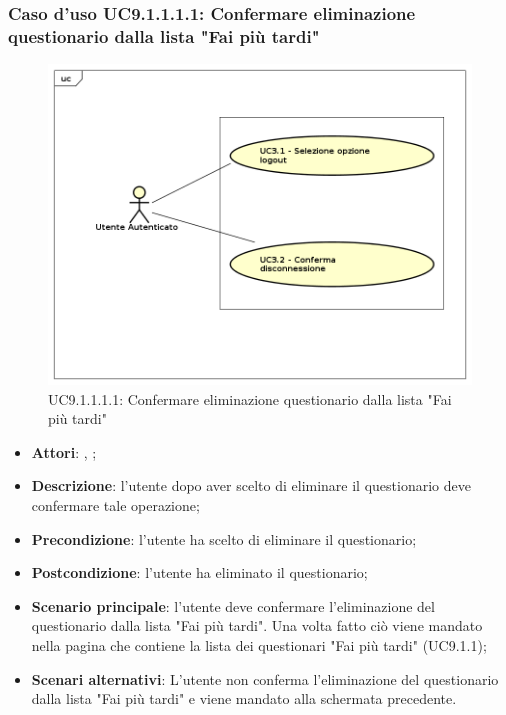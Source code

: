 					\subsubsection{Caso d'uso UC9.1.1.1.1: Confermare eliminazione questionario dalla lista "Fai più tardi"}
					\label{UC9.1.1.1.1}
					\begin{figure}[h]
						\centering
						\includegraphics[scale=0.7,keepaspectratio]{UML/UC9.png}
						\caption{UC9.1.1.1.1: Confermare eliminazione questionario dalla lista "Fai più tardi"}
					\end{figure}
					\FloatBarrier
					\begin{itemize}
						\item \textbf{Attori}: \uau, \uaupro;
						\item \textbf{Descrizione}: l'utente dopo aver scelto di eliminare il questionario deve confermare tale operazione;
						\item \textbf{Precondizione}: l'utente ha scelto di eliminare il questionario;
						\item \textbf{Postcondizione}: l'utente ha eliminato il questionario;
						\item \textbf{Scenario principale}: l'utente deve confermare l'eliminazione del questionario dalla lista "Fai più tardi". Una volta fatto ciò viene mandato nella pagina che contiene la lista dei questionari "Fai più tardi" (UC9.1.1);
						\item \textbf{Scenari alternativi}: L'utente non conferma l'eliminazione del questionario dalla lista "Fai più tardi" e viene mandato alla schermata precedente.
					\end{itemize}
							
